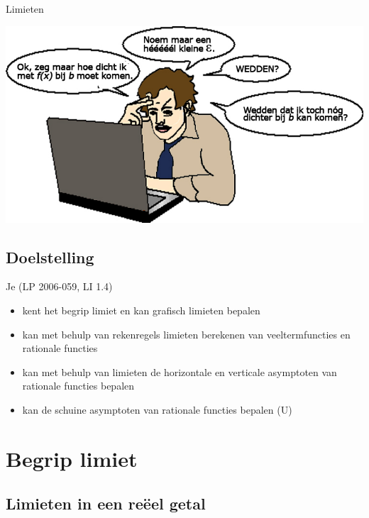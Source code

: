 \documentclass[12pt,twoside,a4paper]{article}
\begin{document}
\begin{center}
  \begin{mdframed}
    \centering
    \fontsize{50}{60}\selectfont Limieten
  \end{mdframed}
  \vfill
  \includegraphics[width=\textwidth]{limieten}
  \vfill
\end{center}

\subsection*{Doelstelling}
Je \hfill  {\scriptsize(LP 2006-059, LI 1.4)}
\begin{itemize}
\item kent het begrip limiet en kan grafisch limieten bepalen
\item kan met behulp van rekenregels limieten berekenen van veeltermfuncties en rationale functies
\item kan met behulp van limieten de horizontale en verticale asymptoten van rationale functies bepalen
\item kan de schuine asymptoten van rationale functies bepalen (U)
\end{itemize}

\thispagestyle{empty}
\newpage

\tableofcontents
\thispagestyle{empty}
\newpage


\pagestyle{fancy}
\fancyhead[RE,LO]{}

\cleardoublepage
\section{Begrip limiet}

\subsection{Limieten in een reëel getal}
\end{document}
